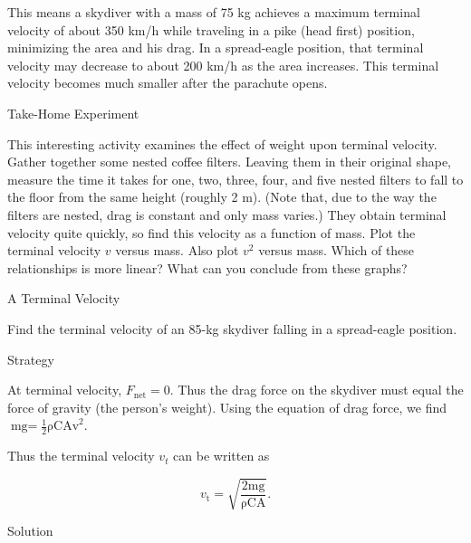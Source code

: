 \documentclass[
]{book}
\newenvironment{tinysection}{}{}
\newenvironment{note}{}{}
\begin{document}
This means a skydiver with a mass of 75 kg achieves a maximum terminal
velocity of about 350 km/h while traveling in a pike (head first)
position, minimizing the area and his drag. In a spread-eagle position,
that terminal velocity may decrease to about 200 km/h as the area
increases. This terminal velocity becomes much smaller after the
parachute opens.

\hypertarget{fs-id1165298779158}{}
\begin{note}

Take-Home Experiment

This interesting activity examines the effect of weight upon terminal
velocity. Gather together some nested coffee filters. Leaving them in
their original shape, measure the time it takes for one, two, three,
four, and five nested filters to fall to the floor from the same height
(roughly 2 m). (Note that, due to the way the filters are nested, drag
is constant and only mass varies.) They obtain terminal velocity quite
quickly, so find this velocity as a function of mass. Plot the terminal
velocity \emph{\(v{}\)} versus mass. Also plot \emph{\(v^{2}{}\)} versus mass. Which
of these relationships is more linear? What can you conclude from these
graphs?

\end{note}

\hypertarget{fs-id1165298642932}{}
A Terminal Velocity

Find the terminal velocity of an 85-kg skydiver falling in a
spread-eagle position.

\begin{tinysection}

{Strategy}

\end{tinysection}

At terminal velocity, \({F_{\text{net}} = 0}{}\). Thus the drag force on
the skydiver must equal the force of gravity (the person's weight).
Using the equation of drag force, we find
\({{\text{mg} =}\frac{1}{2}\text{ρCAv}^{2}}{}\).

Thus the terminal velocity \(v_{t}{}\) can be written as

\leavevmode\hypertarget{eip-306}{}%
\[{{v_{\text{t}} = \sqrt{\frac{2\text{mg}}{\text{ρCA}}}}.}{}\]

\begin{tinysection}

{Solution}

\end{tinysection}
\end{document}
